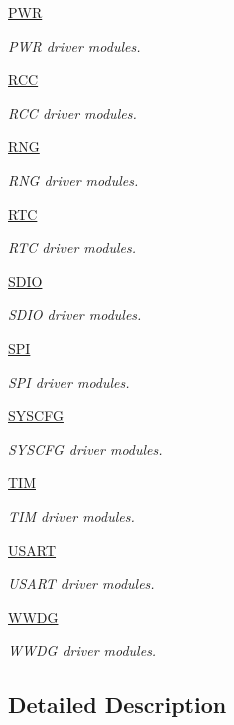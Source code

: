 \begin{DoxyCompactItemize}
\hyperlink{group___p_w_r}{P\-W\-R}
\begin{DoxyCompactList}\small\item\em P\-W\-R driver modules. \end{DoxyCompactList}\item 
\hyperlink{group___r_c_c}{R\-C\-C}
\begin{DoxyCompactList}\small\item\em R\-C\-C driver modules. \end{DoxyCompactList}\item 
\hyperlink{group___r_n_g}{R\-N\-G}
\begin{DoxyCompactList}\small\item\em R\-N\-G driver modules. \end{DoxyCompactList}\item 
\hyperlink{group___r_t_c}{R\-T\-C}
\begin{DoxyCompactList}\small\item\em R\-T\-C driver modules. \end{DoxyCompactList}\item 
\hyperlink{group___s_d_i_o}{S\-D\-I\-O}
\begin{DoxyCompactList}\small\item\em S\-D\-I\-O driver modules. \end{DoxyCompactList}\item 
\hyperlink{group___s_p_i}{S\-P\-I}
\begin{DoxyCompactList}\small\item\em S\-P\-I driver modules. \end{DoxyCompactList}\item 
\hyperlink{group___s_y_s_c_f_g}{S\-Y\-S\-C\-F\-G}
\begin{DoxyCompactList}\small\item\em S\-Y\-S\-C\-F\-G driver modules. \end{DoxyCompactList}\item 
\hyperlink{group___t_i_m}{T\-I\-M}
\begin{DoxyCompactList}\small\item\em T\-I\-M driver modules. \end{DoxyCompactList}\item 
\hyperlink{group___u_s_a_r_t}{U\-S\-A\-R\-T}
\begin{DoxyCompactList}\small\item\em U\-S\-A\-R\-T driver modules. \end{DoxyCompactList}\item 
\hyperlink{group___w_w_d_g}{W\-W\-D\-G}
\begin{DoxyCompactList}\small\item\em W\-W\-D\-G driver modules. \end{DoxyCompactList}\end{DoxyCompactItemize}


\subsection{Detailed Description}
